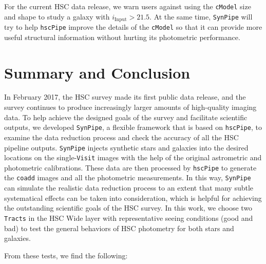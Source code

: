 \documentclass[useamsfonts]{pasj01}
\def\hscpipe{\texttt{hscPipe}}
\def\synpipe{\texttt{SynPipe}}
\def\cmodel{\texttt{cModel}}
\def\coadd{\texttt{coadd}}
\def\visit{\texttt{Visit}}
\def\tracts{\texttt{Tracts}}
\begin{document}
    For the current HSC data release, we warn users against using the \cmodel{}
    size and shape to study a galaxy with $i_{\mathrm{Input}}>21.5$.
    At the same time, \synpipe{} will try to help \hscpipe{} improve the details
    of the \cmodel{} so that it can provide more useful structural information without hurting its photometric performance.


\section{Summary and Conclusion}
    \label{sec:summary}

    In February 2017, the HSC survey made its first public data release, and the survey continues to
    produce increasingly larger amounts of high-quality imaging data.
    To help achieve the designed goals of the survey and facilitate scientific
    outputs, we developed \synpipe{}, a flexible framework that is based on
    \hscpipe{}, to examine the data reduction process and check the accuracy of all the HSC pipeline outputs.
    \synpipe{} injects synthetic stars and galaxies into the desired locations on the
    single-\visit{} images with the help of the original astrometric and
    photometric calibrations.
    These data are then processed by \hscpipe{} to generate the \coadd{} images and
    all the photometric measurements.
    In this way, \synpipe{} can simulate the realistic data reduction process
    to an extent that many subtle systematical effects can be taken into
    consideration, which is helpful for achieving the outstanding scientific goals of the HSC
    survey.
    In this work, we choose two \tracts{} in the HSC Wide layer with
    representative seeing conditions (good and bad) to test the general behaviors of HSC
    photometry for both stars and galaxies.

    From these tests, we find the following:
\end{document}
